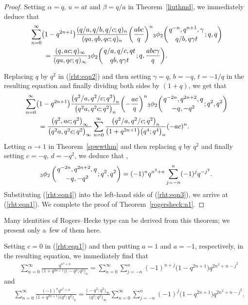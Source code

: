 \documentclass[pdftex]{sigma}
\numberwithin{equation}{section}
\begin{document}
\begin{proof}
Setting $\alpha=q$, $u=at$ and $\beta=q/a$ in Theorem~\ref{liuthmd}, we immediately deduce that
\begin{align}
	&\sum_{n=0}^\infty\bigl(1-q^{2n+1}\bigr) \frac{(q/a, q/b, q/c; q)_n}{(qa, qb, qc; q)_n} \biggl(\frac{abc}{q}\biggr)^n {_3\phi_2}\biggl({{q^{-n}, q^{n+1}, \gamma}\atop{q/b, q\gamma t}}; q, q\biggr)\nonumber\\
	&\qquad{}=\frac{(q, ac; q)_\infty}{(qa, qc; q)_\infty}
	{_3\phi_2}\biggl({{q/a, q/c, qt}\atop{qb, q\gamma t}}; q, \frac{abc\gamma}{q}\biggr).\label{rht:eqn2}	
\end{align}		
	
Replacing $q$ by $q^2$ in (\ref{rht:eqn2}) and then setting $\gamma=q$, $b=-q$, $t=-1/q$ in the resulting equation and finally dividing both sides by $(1+q)$, we get that
\begin{align}	
&\sum_{n=0}^\infty \bigl(1-q^{2n+1}\bigr)	\frac{\bigl(q^2/a, q^2/c; q^2\bigr)_n}{\bigl(q^2a, q^2 c; q^2\bigr)_n}\biggl(-\frac{ac}{q}\biggr)^n {_3\phi_2}\biggl({{q^{-2n}, q^{2n+2}, q}\atop{-q, -q^2}}; q^2, q^2\biggr)\nonumber\\
&\qquad{}=\frac{\bigl(q^2, ac; q^2\bigr)_\infty}{\bigl(q^2a, q^2c; q^2\bigr)_\infty}
\sum_{n=0}^\infty \frac{\bigl(q^2/a, q^2/c; q^2\bigr)_n}{\bigl(1+q^{2n+1}\bigr)\bigl(q^4; q^4\bigr)_n} (-ac)^n.\label{rht:eqn3}
\end{align}
Letting $\alpha \to 1$ in Theorem~\ref{spwwthm} and then replacing $q$ by $q^2$ and finally setting $c=-q$, $d=-q^2$, we deduce that \cite[equation~(6.15)]{Andrews2012}, \cite[equation~(4.5)]{Liu2013IJTN}
\begin{align}\label{rht:eqn4}	
	{_3\phi_2}\left({{q^{-2n}, q^{2n+2}, q }\atop{-q, -q^2}}; q^2, q^2\right)=(-1)^n q^{n^2+n}\sum_{j=-n}^n (-1)^j q^{-j^2}.
\end{align}
Substituting (\ref{rht:eqn4}) into the left-hand side of (\ref{rht:eqn3}), we arrive at (\ref{rht:eqn1}). We complete the proof of Theorem~\ref{rogersheck:n1}.
\end{proof}

Many identities of Rogers--Hecke type can be derived from this theorem; we present only a~few of them here.
		
Setting $c=0$ in (\ref{rht:eqn1}) and then putting $a=1$ and $a=-1$, respectively, in the resulting equation, we immediately find that
\begin{align*}%
&\sum_{n=0}^\infty \frac{q^{n^2+n}}{\bigl(1+q^{2n+1}\bigr)\bigl(-q^2; q^2\bigr)_n}
=\sum_{n=0}^\infty \sum_{j=-n}^n (-1)^{n+j} \bigl(1-q^{2n+1}\bigr) q^{2n^2+n-j^2}
\end{align*}
and
\begin{align*}%
&\sum_{n=0}^\infty \frac{(-1)^n q^{n^2+n}}{\bigl(1+q^{2n+1}\bigr)\bigl(q^2; q^2\bigr)_n}
=\frac{\bigl(-q^2; q^2\bigr)_\infty}{\bigl(q^2; q^2\bigr)_\infty}\sum_{n=0}^\infty \sum_{j=-n}^n (-1)^{j} \bigl(1-q^{2n+1}\bigr) q^{2n^2+n-j^2}. 	
\end{align*}
\end{document}
